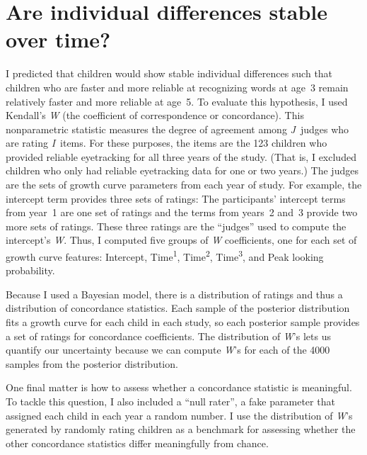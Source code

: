 \documentclass [11pt, proquest] {uwthesis}[2015/03/03]
\begin{document}
\section{Are individual differences stable over
time?}\label{are-individual-differences-stable-over-time}

I predicted that children would show stable individual differences such
that children who are faster and more reliable at recognizing words at
age~3 remain relatively faster and more reliable at age~5. To evaluate
this hypothesis, I used Kendall's \emph{W} (the coefficient of
correspondence or concordance). This nonparametric statistic measures
the degree of agreement among \emph{J}~judges who are rating
\emph{I}~items. For these purposes, the items are the 123 children who
provided reliable eyetracking for all three years of the study. (That
is, I excluded children who only had reliable eyetracking data for one
or two years.) The judges are the sets of growth curve parameters from
each year of study. For example, the intercept term provides three sets
of ratings: The participants' intercept terms from year~1 are one set of
ratings and the terms from years~2 and~3 provide two more sets of
ratings. These three ratings are the ``judges'' used to compute the
intercept's \emph{W}. Thus, I computed five groups of \emph{W}
coefficients, one for each set of growth curve features: Intercept,
Time\textsuperscript{1}, Time\textsuperscript{2},
Time\textsuperscript{3}, and Peak looking probability.

Because I used a Bayesian model, there is a distribution of ratings and
thus a distribution of concordance statistics. Each sample of the
posterior distribution fits a growth curve for each child in each study,
so each posterior sample provides a set of ratings for concordance
coefficients. The distribution of \emph{W}'s lets us quantify our
uncertainty because we can compute \emph{W}'s for each of the 4000
samples from the posterior distribution.

One final matter is how to assess whether a concordance statistic is
meaningful. To tackle this question, I also included a ``null rater'', a
fake parameter that assigned each child in each year a random number. I
use the distribution of \emph{W}'s generated by randomly rating children
as a benchmark for assessing whether the other concordance statistics
differ meaningfully from chance.
\end{document}
